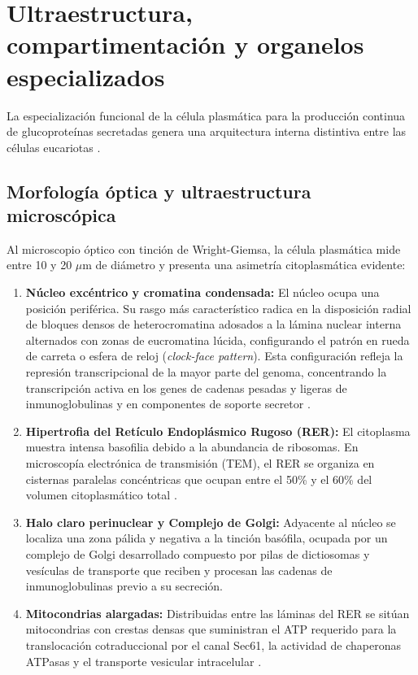 \section{Ultraestructura, compartimentación y organelos especializados}

La especialización funcional de la célula plasmática para la producción continua de glucoproteínas secretadas genera una arquitectura interna distintiva entre las células eucariotas \parencite{cenci2008progressive,karp2020cell}.

\subsection{Morfología óptica y ultraestructura microscópica}
Al microscopio óptico con tinción de Wright-Giemsa, la célula plasmática mide entre 10 y 20 $\mu$m de diámetro y presenta una asimetría citoplasmática evidente:
\begin{enumerate}
	\item \textbf{Núcleo excéntrico y cromatina condensada:} El núcleo ocupa una posición periférica. Su rasgo más característico radica en la disposición radial de bloques densos de heterocromatina adosados a la lámina nuclear interna alternados con zonas de eucromatina lúcida, configurando el patrón en rueda de carreta o esfera de reloj (\emph{clock-face pattern}). Esta configuración refleja la represión transcripcional de la mayor parte del genoma, concentrando la transcripción activa en los genes de cadenas pesadas y ligeras de inmunoglobulinas y en componentes de soporte secretor \parencite{alberts2022molecular}.
	\item \textbf{Hipertrofia del Retículo Endoplásmico Rugoso (RER):} El citoplasma muestra intensa basofilia debido a la abundancia de ribosomas. En microscopía electrónica de transmisión (TEM), el RER se organiza en cisternas paralelas concéntricas que ocupan entre el 50\% y el 60\% del volumen citoplasmático total \parencite{cenci2008progressive}.
	\item \textbf{Halo claro perinuclear y Complejo de Golgi:} Adyacente al núcleo se localiza una zona pálida y negativa a la tinción basófila, ocupada por un complejo de Golgi desarrollado compuesto por pilas de dictiosomas y vesículas de transporte que reciben y procesan las cadenas de inmunoglobulinas previo a su secreción.
	\item \textbf{Mitocondrias alargadas:} Distribuidas entre las láminas del RER se sitúan mitocondrias con crestas densas que suministran el ATP requerido para la translocación cotraduccional por el canal Sec61, la actividad de chaperonas ATPasas y el transporte vesicular intracelular \parencite{lam2018metabolic}.
\end{enumerate}

